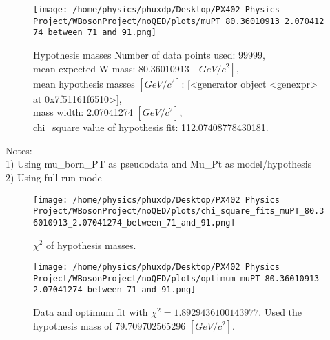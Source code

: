\documentclass[12pt]{article}
\begin{document}
	\begin{figure}[tb]
		\centering
		\texttt{[image: /home/physics/phuxdp/Desktop/PX402 Physics Project/WBosonProject/noQED/plots/muPT\_80.36010913\_2.07041274\_between\_71\_and\_91.png]}
		\caption{\small Hypothesis masses Number of data points used: 99999,\\
mean expected W mass: 80.36010913 $[GeV/c^{2}]$,\\
mean hypothesis masses $[GeV/c^{2}]$: [<generator object <genexpr> at 0x7f51161f6510>],\\
mass width: 2.07041274 $[GeV/c^{2}]$,\\
chi_square value of hypothesis fit: 112.07408778430181. }
		\label{fig: fig_0}
	\end{figure}
    Notes: \\
    1) Using mu\_born\_PT as pseudodata and  Mu\_Pt as model/hypothesis\\
    2) Using full run mode\\
       \begin{figure}[tb]
		\centering
		\texttt{[image: /home/physics/phuxdp/Desktop/PX402 Physics Project/WBosonProject/noQED/plots/chi\_square\_fits\_muPT\_80.36010913\_2.07041274\_between\_71\_and\_91.png]}
		\caption{\small $\chi^2$ of hypothesis masses. }
		\label{fig: fig_chi_square}
	\end{figure}

    \begin{figure}[tb]
		\centering
		\texttt{[image: /home/physics/phuxdp/Desktop/PX402 Physics Project/WBosonProject/noQED/plots/optimum\_muPT\_80.36010913\_2.07041274\_between\_71\_and\_91.png]}
		\caption{\small Data and optimum fit with $\chi^2 = 1.8929436100143977$. Used the hypothesis mass of 79.709702565296 $[GeV/c^{2}]$. }
		\label{fig: fig_optim_parms}
	\end{figure}
    
\end{document}
